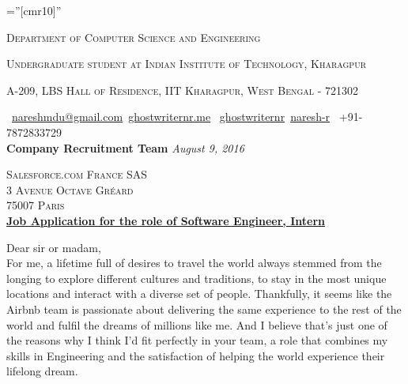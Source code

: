 \documentclass[a4paper,10pt]{extarticle} %
\begin{document}
\pagestyle{empty} %

\font\fb=''[cmr10]'' %


\par{\par} %
\par{\centering\large {\textsc{Department of Computer Science and Engineering}}\par}\large
\par{\centering\large {\textsc{Undergraduate student at Indian Institute of Technology, Kharagpur}}\par}\large
\par{\centering\large {\textsc{A-209, LBS Hall of Residence, IIT Kharagpur, West Bengal - 721302}}\par}\large
\hspace{0.5cm}\normalsize \faEnvelope\ {\href{mailto:nareshmdu@gmail.com}{nareshmdu@gmail.com}}\hfill \normalsize  \faGlobe\ {\href{http://ghostwriternr.me/}{ghostwriternr.me}} \hfill \normalsize \faGithub\ {\href{https://github.com/ghostwriternr}{ghostwriternr}}\hfill \normalsize  \faLinkedinSquare\ {\href{https://www.linkedin.com/in/naresh-r-464a8b8b}{naresh-r}} \hfill {\faPhone\ +91-7872833729} \hspace{0.5cm} \\[10pt]

\textbf{\large{Company Recruitment Team}} \hfill \textit{August 9, 2016}

\textsc{Salesforce.com France SAS} \\
\textsc{3 Avenue Octave Gréard}\\
\textsc{75007 Paris} \\

\underline{\textbf{Job Application for the role of Software Engineer, Intern}}

Dear sir or madam,\\

For me, a lifetime full of desires to travel the world always stemmed from the longing to explore different cultures and traditions, to stay in the most unique locations and interact with a diverse set of people. Thankfully, it seems like the Airbnb team is passionate about delivering the same experience to the rest of the world and fulfil the dreams of millions like me. And I believe that's just one of the reasons why I think I'd fit perfectly in your team, a role that combines my skills in Engineering and the satisfaction of helping the world experience their lifelong dream. \\
\end{document}
